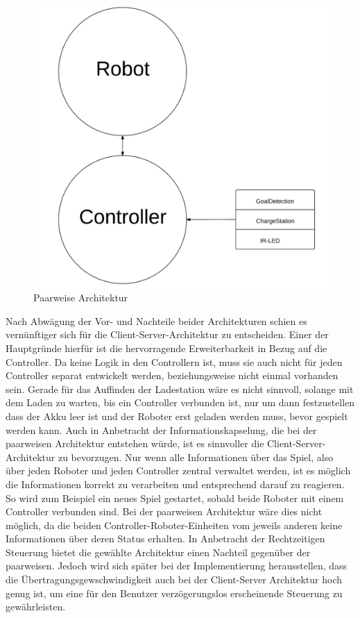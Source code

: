 \begin{figure}[ht]
	\includegraphics[scale=0.25]{images/paarweise_architektur.pdf}
	\caption{Paarweise Architektur}
	\label{fig:paarweise_architektur}
\end{figure}


Nach Abwägung der Vor- und Nachteile beider Architekturen schien es vernünftiger sich für die Client-Server-Architektur zu entscheiden. Einer der Hauptgründe hierfür ist die hervorragende Erweiterbarkeit in Bezug auf die Controller. Da keine Logik in den Controllern ist, muss sie auch nicht für jeden Controller separat entwickelt werden, beziehungsweise nicht einmal vorhanden sein. Gerade für das Auffinden der Ladestation wäre es nicht sinnvoll, solange mit dem Laden zu warten, bis ein Controller verbunden ist, nur um dann festzustellen dass der Akku leer ist und der Roboter erst geladen werden muss, bevor gespielt werden kann. Auch in Anbetracht der Informationskapselung, die bei der paarweisen Architektur entstehen würde, ist es sinnvoller die Client-Server-Architektur zu bevorzugen. Nur wenn alle Informationen über das Spiel, also über jeden Roboter und jeden Controller zentral verwaltet werden, ist es möglich die Informationen korrekt zu verarbeiten und entsprechend darauf zu reagieren. So wird zum Beispiel ein neues Spiel gestartet, sobald beide Roboter mit einem Controller verbunden sind. Bei der paarweisen Architektur wäre dies nicht möglich, da die beiden Controller-Roboter-Einheiten vom jeweils anderen keine Informationen über deren Status erhalten. In Anbetracht der Rechtzeitigen Steuerung bietet die gewählte Architektur einen Nachteil gegenüber der paarweisen. Jedoch wird sich später bei der Implementierung herausstellen, dass die Übertragungsgewschwindigkeit auch bei der Client-Server Architektur hoch genug ist, um eine für den Benutzer verzögerungslos erscheinende Steuerung zu gewährleisten.